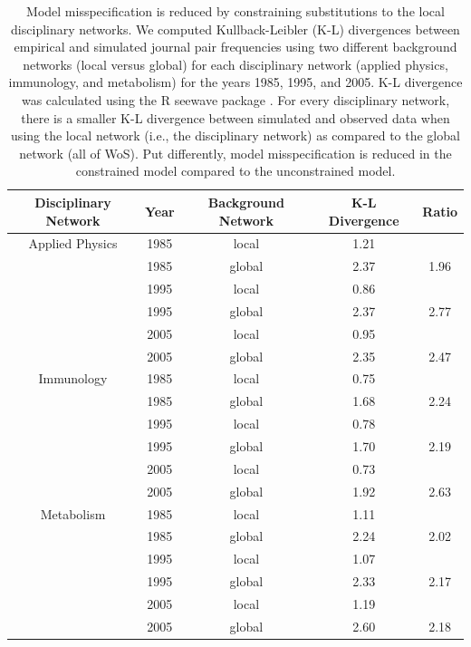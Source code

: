 \documentclass[NETN]{stjour}
\begin{document}
\begin{table}[ht]
\caption{Model misspecification is reduced by constraining substitutions to the local  disciplinary networks. We computed Kullback-Leibler (K-L) divergences between empirical and simulated journal pair frequencies using two different
background networks (local versus global) for each disciplinary network  (applied physics, immunology, and metabolism) for the years 1985, 1995, and 2005. K-L divergence was calculated using the R seewave package \citep{seewave2008}.  
For every disciplinary network, there is a smaller K-L divergence between simulated and observed data when using the local network (i.e., the disciplinary network) as compared to the global network (all of WoS). Put differently, model misspecification is reduced in the constrained model compared to the unconstrained model.}
\label{tab:kld}
\centering
\begin{tabular}{| ccccc |} 
  \hline
 Disciplinary Network & Year & Background Network & K-L Divergence & Ratio \\ 
  \hline
Applied Physics & 1985 & local & 1.21 &  \\ 
  & 1985 & global & 2.37 & 1.96 \\ 
  & 1995 & local & 0.86 &  \\ 
  & 1995 & global  & 2.37 & 2.77 \\ 
  & 2005 & local & 0.95 &  \\ 
  & 2005 & global  & 2.35 & 2.47 \\ 
    \hline
Immunology & 1985 & local & 0.75 &  \\ 
  & 1985 & global  & 1.68 & 2.24 \\ 
   & 1995 & local & 0.78 &  \\ 
   & 1995 & global  & 1.70 & 2.19 \\ 
   & 2005 & local & 0.73 &  \\ 
  & 2005 & global  & 1.92 & 2.63 \\ 
    \hline
Metabolism & 1985 & local & 1.11 &  \\ 
   & 1985 & global  & 2.24 & 2.02 \\ 
  & 1995 & local & 1.07 &  \\ 
  & 1995 & global  & 2.33 & 2.17 \\ 
     & 2005 & local & 1.19 &  \\ 
   & 2005 & global  & 2.60 & 2.18 \\ 
   \hline
\end{tabular}
\end{table}
\end{document}
